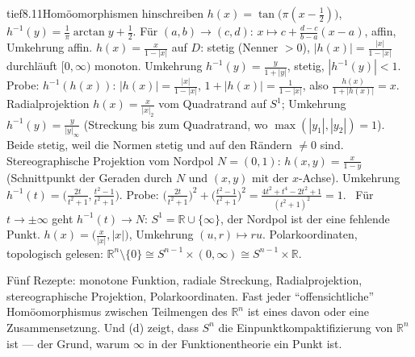 \begin{loesungkarte}{tief}{8.11}{Homöomorphismen hinschreiben}
$h(x) = \tan\bigl(\pi(x - \frac12)\bigr)$, $h^{-1}(y) = \frac1\pi\arctan y + \frac12$. Für $(a, b)\to(c, d)$: $x\mapsto c + \frac{d - c}{b - a}(x - a)$, affin, Umkehrung affin.
$h(x) = \frac x{1 - |x|}$ auf $D$: stetig (Nenner $> 0$), $|h(x)| = \frac{|x|}{1 - |x|}$ durchläuft $[0, \infty)$ monoton. Umkehrung $h^{-1}(y) = \frac y{1 + |y|}$, stetig, $|h^{-1}(y)| < 1$. Probe: $h^{-1}(h(x))$: $|h(x)| = \frac{|x|}{1 - |x|}$, $1 + |h(x)| = \frac1{1 - |x|}$, also $\frac{h(x)}{1 + |h(x)|} = x$. \checkmark
{}
Radialprojektion $h(x) = \frac x{|x|_2}$ vom Quadratrand auf $S^{1}$; Umkehrung $h^{-1}(y) = \frac y{|y|_\infty}$ (Streckung bis zum Quadratrand, wo $\max(|y_1|, |y_2|) = 1$). Beide stetig, weil die Normen stetig und auf den Rändern $\neq0$ sind.
Stereographische Projektion vom Nordpol $N = (0, 1)$: $h(x, y) = \frac x{1 - y}$ (Schnittpunkt der Geraden durch $N$ und $(x, y)$ mit der $x$-Achse). Umkehrung $h^{-1}(t) = \bigl(\frac{2t}{t^{2} + 1}, \frac{t^{2} - 1}{t^{2} + 1}\bigr)$. Probe: $\bigl(\frac{2t}{t^{2} + 1}\bigr)^{2} + \bigl(\frac{t^{2} - 1}{t^{2} + 1}\bigr)^{2} = \frac{4t^{2} + t^{4} - 2t^{2} + 1}{(t^{2} + 1)^{2}} = 1$. \checkmark\ Für $t\to\pm\infty$ geht $h^{-1}(t)\to N$: $S^{1} = \mathbb R\cup\{\infty\}$, der Nordpol ist der eine fehlende Punkt.
$h(x) = \bigl(\frac x{|x|}, |x|\bigr)$, Umkehrung $(u, r)\mapsto ru$. Polarkoordinaten, topologisch gelesen: $\mathbb R^{n}\setminus\{0\}\cong S^{n-1}\times(0, \infty)\cong S^{n-1}\times\mathbb R$.
\begin{mitnehmen}\kastentext
Fünf Rezepte: monotone Funktion, radiale Streckung, Radialprojektion, stereographische Projektion, Polarkoordinaten. Fast jeder \enquote{offensichtliche} Homöomorphismus zwischen Teilmengen des $\mathbb R^{n}$ ist eines davon oder eine Zusammensetzung. Und (d) zeigt, dass $S^{n}$ die Einpunktkompaktifizierung von $\mathbb R^{n}$ ist --- der Grund, warum $\infty$ in der Funktionentheorie ein Punkt ist.
\end{mitnehmen}
\end{loesungkarte}

